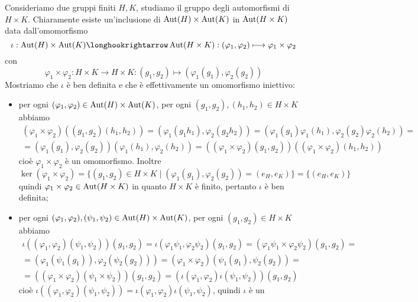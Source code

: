 \documentclass[11pt]{scrartcl}
\begin{document}
Consideriamo due gruppi finiti $H, K$, studiamo il gruppo degli automorfismi 
di $H\times K$. Chiaramente esiste un'inclusione di $\operatorname{Aut}(H)\times \operatorname{Aut}(K)$ in 
$\operatorname{Aut}(H\times K)$ data dall'omomorfismo 
\[
    \iota: \Aut(H)\times \Aut(K)\longhookrightarrow \Aut(H\times K) :
    (\varphi_1, \varphi_2)\longmapsto \varphi_1\times \varphi_2
\]con 
\[
    \varphi_1\times\varphi_2: H\times K \longrightarrow H\times K:
    (g_1, g_2)\longmapsto (\varphi_1(g_1), \varphi_2(g_2))
\]
Mostriamo che $\iota$ è ben definita e che è effettivamente un omomorfismo iniettivo:
\begin{itemize}
    \item per ogni $(\varphi_1, \varphi_2)\in \operatorname{Aut}(H)\times \operatorname{Aut}(K)$, per ogni
     $(g_1, g_2), (h_1, h_2)\in H\times K$ abbiamo 
     \begin{multline*}
        (\varphi_1\times\varphi_2)((g_1, g_2)(h_1, h_2)) = 
        (\varphi_1(g_1h_1), \varphi_2(g_2h_2)) = 
        (\varphi_1(g_1)\varphi_1(h_1), \varphi_2(g_2)\varphi_2(h_2)) = \\
        =(\varphi_1(g_1), \varphi_2(g_2))(\varphi_1(h_1),\varphi_2(h_2)) = 
        ((\varphi_1\times\varphi_2)(g_1, g_2))((\varphi_1\times\varphi_2)(h_1,h_2))
     \end{multline*}
     cioè $\varphi_1\times\varphi_2$ è un omomorfismo. Inoltre 
    \[
        \ker (\varphi_1\times\varphi_2) = \{(g_1, g_2) \in H\times K\mid 
        (\varphi_1(g_1), \varphi_2(g_2)) = (e_H, e_K)\} = \{(e_H, e_K)\}
    \]
    quindi $\varphi_1\times \varphi_2 \in \operatorname{Aut}(H\times K)$
    in quanto $H\times K$ è finito, pertanto $\iota$ è ben definita;
    \item per ogni $(\varphi_1, \varphi_2), (\psi_1, \psi_2) \in \operatorname{Aut}(H)\times \operatorname{Aut}(K)$,
    per ogni $(g_1, g_2) \in H\times K$ abbiamo 
    \begin{multline*}
        \iota((\varphi_1, \varphi_2)(\psi_1, \psi_2))(g_1, g_2) = 
        \iota(\varphi_1\psi_1, \varphi_2\psi_2)(g_1, g_2) = 
        (\varphi_1\psi_1\times\varphi_2\psi_2)(g_1, g_2) =\\
        = (\varphi_1(\psi_1(g_1)), \varphi_2(\psi_2(g_2))) = 
        (\varphi_1\times\varphi_2)(\psi_1(g_1), \psi_2(g_2)) = \\
        = ((\varphi_1\times\varphi_2)(\psi_1\times\psi_2))(g_1, g_2) = 
        (\iota(\varphi_1, \varphi_2)\iota(\psi_1,\psi_2))(g_1, g_2)
    \end{multline*}cioè $\iota((\varphi_1, \varphi_2)(\psi_1, \psi_2)) = 
    \iota(\varphi_1, \varphi_2)\iota(\psi_1, \psi_2)$, quindi $\iota$ è un 

\end{itemize}
\end{document}
